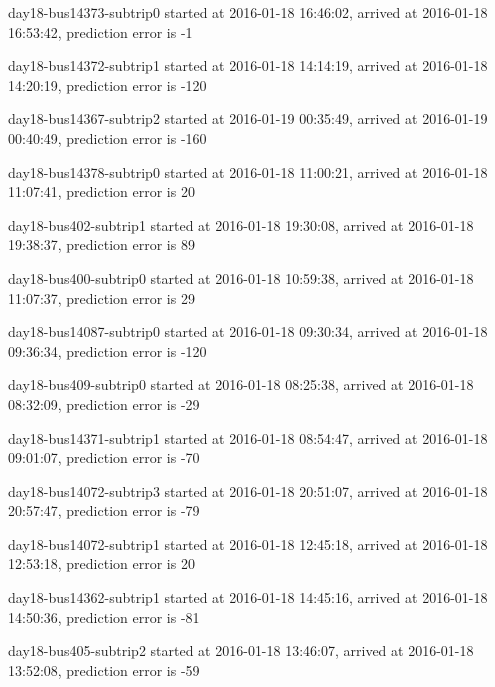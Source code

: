 \documentclass[12pt,a4paper,oneside,openright]{report}
\begin{document}
{day18-bus14373-subtrip0 started at 2016-01-18 16:46:02, arrived at 2016-01-18 16:53:42, prediction error is -1

day18-bus14372-subtrip1 started at 2016-01-18 14:14:19, arrived at 2016-01-18 14:20:19, prediction error is -120

day18-bus14367-subtrip2 started at 2016-01-19 00:35:49, arrived at 2016-01-19 00:40:49, prediction error is -160

day18-bus14378-subtrip0 started at 2016-01-18 11:00:21, arrived at 2016-01-18 11:07:41, prediction error is 20

day18-bus402-subtrip1 started at 2016-01-18 19:30:08,    arrived at 2016-01-18 19:38:37, prediction error is 89

day18-bus400-subtrip0 started at 2016-01-18 10:59:38,    arrived at 2016-01-18 11:07:37, prediction error is 29

day18-bus14087-subtrip0 started at 2016-01-18 09:30:34, arrived at 2016-01-18 09:36:34, prediction error is -120

day18-bus409-subtrip0 started at 2016-01-18 08:25:38,    arrived at 2016-01-18 08:32:09, prediction error is -29

day18-bus14371-subtrip1 started at 2016-01-18 08:54:47, arrived at 2016-01-18 09:01:07, prediction error is -70

day18-bus14072-subtrip3 started at 2016-01-18 20:51:07, arrived at 2016-01-18 20:57:47, prediction error is -79

day18-bus14072-subtrip1 started at 2016-01-18 12:45:18, arrived at 2016-01-18 12:53:18, prediction error is 20

day18-bus14362-subtrip1 started at 2016-01-18 14:45:16, arrived at 2016-01-18 14:50:36, prediction error is -81

day18-bus405-subtrip2 started at 2016-01-18 13:46:07,    arrived at 2016-01-18 13:52:08, prediction error is -59 \\
}
\end{document}
